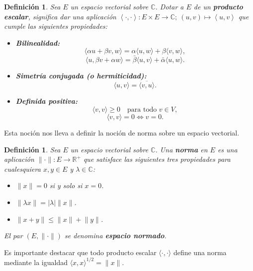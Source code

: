 \documentclass[12pt]{article}
\newcommand{\C}{\mathbb{C}}
\theoremstyle{plain}
\newtheorem{definicion}[teorema]{\textbf{Definición}}
\theoremstyle{definition}
\numberwithin{equation}{section}
\begin{document}
            \begin{definicion}
                Sea $E$ un espacio vectorial sobre \( \C \). Dotar a $E$ de un \textbf{producto escalar}, significa dar una aplicación \(\left\langle \cdot,\cdot \right\rangle: E \times E \to \mathbb{C};\ (u,v) \mapsto \left\langle u,v \right\rangle\) que cumple las siguientes propiedades:
                \begin{itemize}
                    \item[(i)] \textbf{Bilinealidad:} $$\langle \alpha u + \beta v, w \rangle = \alpha \langle u, w \rangle + \beta \langle v, w \rangle,$$ $$\langle  u ,  \beta v +  \alpha w\rangle = \bar{\beta}  \langle u, v \rangle + \bar{\alpha}  \langle u, w \rangle.$$
                    \item[(ii)]\textbf{Simetría conjugada (o hermiticidad):} $$\langle u, v \rangle = \overline{\langle v, u \rangle}.$$
                    \item[(iii)] \textbf{Definida positiva:} $$\langle v, v \rangle \geq 0 \quad \text{para todo } v \in V,$$$$\langle v, v \rangle = 0 \iff v = 0.$$
                \end{itemize}
            \end{definicion}
            Esta noción nos lleva a definir la noción de norma sobre un espacio vectorial.
            \begin{definicion}
                Sea $E$ un espacio vectorial sobre $\mathbb{C}$. Una \textbf{norma} en $E$ es una aplicación $\lVert \cdot \rVert \colon E \to \mathbb{R}^+$ que satisface las siguientes tres propiedades para cualesquiera $x, y \in E$ y $\lambda \in \mathbb{C}$:
                \begin{itemize}
                    \item[(1)] $\lVert x \rVert = 0$ si y solo si $x = 0$.
                    \item[(2)] $\lVert \lambda x \rVert = |\lambda| \lVert x \rVert$.
                    \item[(3)] $\lVert x + y \rVert \leq \lVert x \rVert + \lVert y \rVert$.
                \end{itemize}
                El par $(E, \lVert \cdot \rVert)$ se denomina \textbf{espacio normado}. 
            \end{definicion}
            Es importante destacar que todo producto escalar \(\langle \cdot, \cdot \rangle\) define una norma mediante la igualdad \( \langle x, x \rangle^{1/2}  = \lVert x \rVert \).
\end{document}
